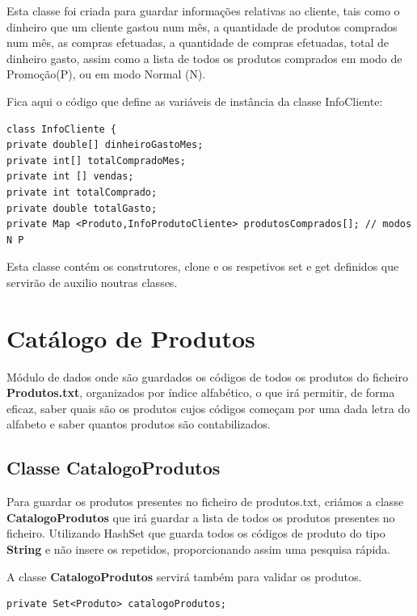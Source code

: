 Esta classe foi criada para guardar informações relativas ao cliente, tais como o dinheiro que um cliente gastou num mês, a quantidade de produtos comprados num mês, as compras efetuadas, a quantidade de compras efetuadas, total de dinheiro gasto, assim como a lista de todos os produtos comprados em modo de Promoção(P), ou em modo Normal (N).  


Fica aqui o código que define as variáveis de instância da classe InfoCliente:

\begin{Verbatim}
class InfoCliente {
private double[] dinheiroGastoMes;
private int[] totalCompradoMes;
private int [] vendas;
private int totalComprado;
private double totalGasto;
private Map <Produto,InfoProdutoCliente> produtosComprados[]; // modos N P

\end{Verbatim}


Esta classe contém os construtores, clone e os respetivos set e get definidos que servirão de auxilio noutras classes. 



\section{Catálogo de Produtos}

 Módulo de dados onde são guardados os códigos de todos os produtos do ficheiro \textbf{Produtos.txt}, organizados por índice alfabético, o que irá permitir, de forma eficaz, saber quais são os produtos cujos códigos começam por uma dada letra do alfabeto e saber quantos produtos são contabilizados. 
 
 \subsection{Classe CatalogoProdutos}
 
 Para guardar os produtos presentes no ficheiro de produtos.txt, criámos a classe \color{blue} \textbf{CatalogoProdutos} \color{black} que
 irá guardar a lista de todos os produtos presentes no ficheiro. Utilizando \color{blue} HashSet \color{black} que guarda todos os códigos de produto do tipo \color{blue} \textbf{String} \color{black} e não insere os repetidos, proporcionando assim uma pesquisa rápida.
 
 A classe \color{blue} \textbf{CatalogoProdutos} \color{black} servirá também para validar os produtos.

\begin{verbatim}
private Set<Produto> catalogoProdutos;
\end{verbatim}

